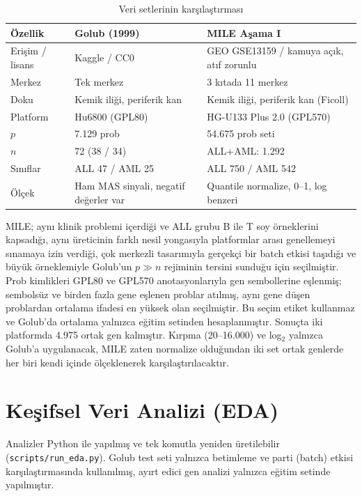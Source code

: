 \documentclass[conference]{IEEEtran}
\begin{document}
\begin{table}[htbp]
\caption{Veri setlerinin karşılaştırması}
\label{tab:veri}
\centering
\scriptsize
\begin{tabularx}{\columnwidth}{@{}l L L@{}}
\toprule
Özellik & Golub (1999) & MILE Aşama I \\
\midrule
Erişim / lisans & Kaggle / CC0 & GEO GSE13159 / kamuya açık, atıf zorunlu \\
Merkez & Tek merkez & 3 kıtada 11 merkez \\
Doku & Kemik iliği, periferik kan & Kemik iliği, periferik kan (Ficoll) \\
Platform & Hu6800 (GPL80) & HG-U133 Plus 2.0 (GPL570) \\
$p$ & 7.129 prob & 54.675 prob seti \\
$n$ & 72 (38 / 34) & ALL+AML: 1.292 \\
Sınıflar & ALL 47 / AML 25 & ALL 750 / AML 542 \\
Ölçek & Ham MAS sinyali, negatif değerler var & Quantile normalize, 0--1, log benzeri \\
\bottomrule
\end{tabularx}
\end{table}

MILE; aynı klinik problemi içerdiği ve ALL grubu B ile T soy örneklerini kapsadığı, aynı üreticinin farklı nesil yongasıyla platformlar arası genellemeyi sınamaya izin verdiği, çok merkezli tasarımıyla gerçekçi bir batch etkisi taşıdığı ve büyük örneklemiyle Golub'un $p \gg n$ rejiminin tersini sunduğu için seçilmiştir. Prob kimlikleri GPL80 ve GPL570 anotasyonlarıyla gen sembollerine eşlenmiş; sembolsüz ve birden fazla gene eşlenen problar atılmış, aynı gene düşen problardan ortalama ifadesi en yüksek olan seçilmiştir. Bu seçim etiket kullanmaz ve Golub'da ortalama yalnızca eğitim setinden hesaplanmıştır. Sonuçta iki platformda 4.975 ortak gen kalmıştır. Kırpma (20--16.000) ve log$_2$ yalnızca Golub'a uygulanacak, MILE zaten normalize olduğundan iki set ortak genlerde her biri kendi içinde ölçeklenerek karşılaştırılacaktır.

\section{Keşifsel Veri Analizi (EDA)}
Analizler Python ile yapılmış ve tek komutla yeniden üretilebilir (\texttt{scripts/run\_eda.py}). Golub test seti yalnızca betimleme ve parti (batch) etkisi karşılaştırmasında kullanılmış, ayırt edici gen analizi yalnızca eğitim setinde yapılmıştır.
\end{document}
